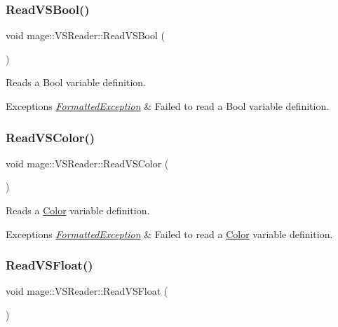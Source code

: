\subsubsection{\texorpdfstring{Read\+V\+S\+Bool()}{ReadVSBool()}}
{\footnotesize\ttfamily void mage\+::\+V\+S\+Reader\+::\+Read\+V\+S\+Bool (\begin{DoxyParamCaption}{ }\end{DoxyParamCaption})\hspace{0.3cm}{\ttfamily [private]}}

Reads a Bool variable definition.


\begin{DoxyExceptions}{Exceptions}
{\em \hyperlink{structmage_1_1_formatted_exception}{Formatted\+Exception}} & Failed to read a Bool variable definition. \\
\hline
\end{DoxyExceptions}
\hypertarget{classmage_1_1_v_s_reader_a42bdfc1fcc6f385e0f88820491d53e04}{}\label{classmage_1_1_v_s_reader_a42bdfc1fcc6f385e0f88820491d53e04} 
\subsubsection{\texorpdfstring{Read\+V\+S\+Color()}{ReadVSColor()}}
{\footnotesize\ttfamily void mage\+::\+V\+S\+Reader\+::\+Read\+V\+S\+Color (\begin{DoxyParamCaption}{ }\end{DoxyParamCaption})\hspace{0.3cm}{\ttfamily [private]}}

Reads a \hyperlink{structmage_1_1_color}{Color} variable definition.


\begin{DoxyExceptions}{Exceptions}
{\em \hyperlink{structmage_1_1_formatted_exception}{Formatted\+Exception}} & Failed to read a \hyperlink{structmage_1_1_color}{Color} variable definition. \\
\hline
\end{DoxyExceptions}
\hypertarget{classmage_1_1_v_s_reader_a64c525d3d87ed248424e4eba359d9ecf}{}\label{classmage_1_1_v_s_reader_a64c525d3d87ed248424e4eba359d9ecf} 
\subsubsection{\texorpdfstring{Read\+V\+S\+Float()}{ReadVSFloat()}}
{\footnotesize\ttfamily void mage\+::\+V\+S\+Reader\+::\+Read\+V\+S\+Float (\begin{DoxyParamCaption}{ }\end{DoxyParamCaption})\hspace{0.3cm}{\ttfamily [private]}}

